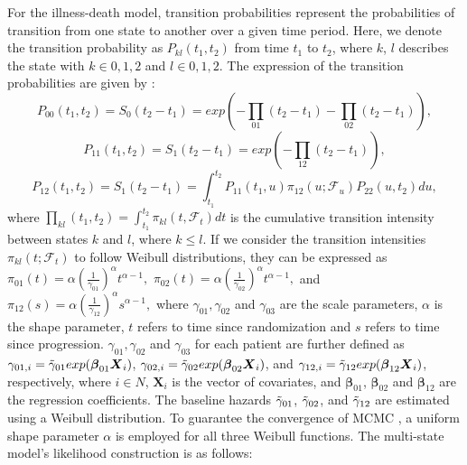 For the illness-death model, transition probabilities represent the probabilities of transition from one state to another over a given time period. Here, we denote the transition probability as $P_{kl}(t_1, t_2)$ from time $t_1$ to $t_2$, where $k$, $l$ describes the state with $k \in {0, 1, 2}$ and $l \in {0, 1, 2}$. The expression of the transition probabilities are given by \citep{meira2009multi}:
$$P_{00}(t_1, t_2) = S_0(t_2 - t_1) = exp{(-\prod_{01}(t_2 - t_1) - \prod_{02}(t_2 - t_1))},$$
$$P_{11}(t_1, t_2) = S_1(t_2 - t_1) = exp{(-\prod_{12}(t_2 - t_1))},$$
$$P_{12}(t_1, t_2) = S_1(t_2 - t_1) = \int_{t_1}^{t_2}P_{11}(t_1, u) \pi_{12}(u;\mathcal{F}_u)P_{22}(u, t_2)du,$$
where $\prod_{kl}(t_1, t_2)=\int_{t_1}^{t_2}\pi_{kl}(t, \mathcal{F}_t)dt$ is the cumulative transition intensity between states $k$ and $l$, where $k \leq l$. If we consider the transition intensities $\pi_{kl}(t; \mathcal{F}_t)$ to follow Weibull distributions, they can be expressed as
$\pi_{01}(t)=\alpha\left(\frac{1}{\gamma_{01}}\right)^\alpha t^{\alpha - 1},$
$\pi_{02}(t)=\alpha\left(\frac{1}{\gamma_{02}}\right)^\alpha t^{\alpha - 1},$
and $\pi_{12}(s)=\alpha\left(\frac{1}{\gamma_{12}}\right)^\alpha s^{\alpha - 1},$
where $\gamma_{01}, \gamma_{02}$ and $\gamma_{03}$ are the scale parameters, $\alpha$ is the shape parameter, $t$ refers to time since randomization and $s$ refers to time since progression. $\gamma_{01}, \gamma_{02}$ and $\gamma_{03}$ for each patient are further defined as $\gamma_{01,i} = \Tilde{\gamma}_{01}exp(\boldsymbol{\beta}_{01}\boldsymbol{X}_i)$, $\gamma_{02,i} = \Tilde{\gamma}_{02}exp(\boldsymbol{\beta}_{02}\boldsymbol{X}_i)$, and $\gamma_{12,i} = \Tilde{\gamma}_{12}exp(\boldsymbol{\beta}_{12}\boldsymbol{X}_i)$, respectively, where $i \in N$, $\boldsymbol{X}_i$ is the vector of covariates, and $\boldsymbol{\beta}_{01}$, $\boldsymbol{\beta}_{02}$ and $\boldsymbol{\beta}_{12}$ are the regression coefficients. The baseline hazards $\Tilde{\gamma}_{01}$, $\Tilde{\gamma}_{02}$, and $\Tilde{\gamma}_{12}$ are estimated using a Weibull distribution. To guarantee the convergence of \ac{MCMC} , a uniform shape parameter $\alpha$ is employed for all three Weibull functions. The multi-state model's likelihood construction is as follows:

